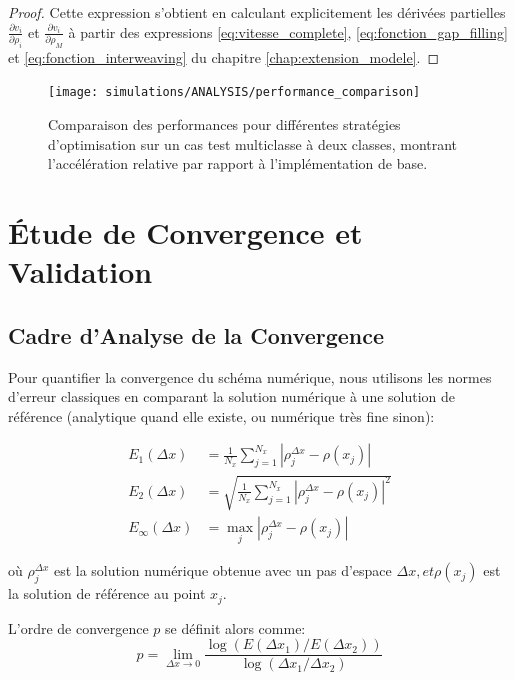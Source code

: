 \begin{proof}
Cette expression s'obtient en calculant explicitement les dérivées partielles $\frac{\partial v_i}{\partial \rho_i}$ et $\frac{\partial v_i}{\partial \rho_M}$ à partir des expressions \eqref{eq:vitesse_complete}, \eqref{eq:fonction_gap_filling} et \eqref{eq:fonction_interweaving} du chapitre \ref{chap:extension_modele}.
\end{proof}

\begin{figure}[htbp]
\centering
\texttt{[image: simulations/ANALYSIS/performance\_comparison]}
\caption{Comparaison des performances pour différentes stratégies d'optimisation sur un cas test multiclasse à deux classes, montrant l'accélération relative par rapport à l'implémentation de base.}
\label{fig:performance}
\end{figure}

\section{Étude de Convergence et Validation}
\label{sec:convergence_validation}

\subsection{Cadre d'Analyse de la Convergence}
\label{subsec:cadre_convergence}

Pour quantifier la convergence du schéma numérique, nous utilisons les normes d'erreur classiques en comparant la solution numérique à une solution de référence (analytique quand elle existe, ou numérique très fine sinon):

\begin{align}
E_1(\Delta x) &= \frac{1}{N_x} \sum_{j=1}^{N_x} |\rho_j^{\Delta x} - \rho(x_j)|\\
E_2(\Delta x) &= \sqrt{\frac{1}{N_x} \sum_{j=1}^{N_x} |\rho_j^{\Delta x} - \rho(x_j)|^2}\\
E_{\infty}(\Delta x) &= \max_{j} |\rho_j^{\Delta x} - \rho(x_j)|
\end{align}

où $\rho_j^{\Delta x}$ est la solution numérique obtenue avec un pas d'espace $\Delta x, et \rho(x_j)$ est la solution de référence au point $x_j$.

L'ordre de convergence $p$ se définit alors comme:
\begin{equation}
p = \lim_{\Delta x \to 0} \frac{\log(E(\Delta x_1)/E(\Delta x_2))}{\log(\Delta x_1/\Delta x_2)}
\end{equation}

